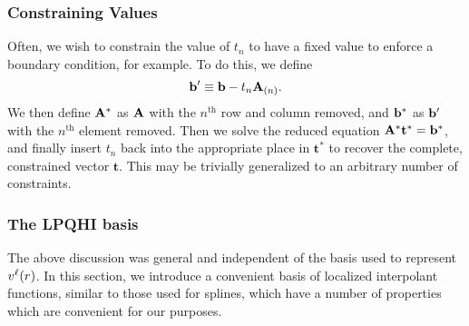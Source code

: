 \subsubsection{Constraining Values}
Often, we wish to constrain the value of $t_n$ to have a fixed value
to enforce a boundary condition, for example.  To do this, we define
\begin{equation}
\mathbf{b}' \equiv \mathbf{b} - t_n \mathbf{A}_{(n)}.
\end{equation}
We then define $\mathbf{A}^*$ as $\mathbf{A}$ with the $n^\text{th}$ row and column
removed, and $\mathbf{b}^*$ as $\mathbf{b}'$ with the $n^\text{th}$ element removed.  Then
we solve the reduced equation $\mathbf{A}^* \mathbf{t}^* = \mathbf{b}^*$, and
finally insert $t_n$ back into the appropriate place in $\mathbf{t}^*$
to recover the complete, constrained vector $\mathbf{t}$.  This may be
trivially generalized to an arbitrary number of constraints.
\label{sec:contraints}

\subsubsection{The LPQHI basis}
The above discussion was general and independent of the basis used to
represent $v^\ell(r)$.  In this section, we introduce a convenient basis
of localized interpolant functions, similar to those used for
splines, which have a number of properties which are convenient for
our purposes.  

